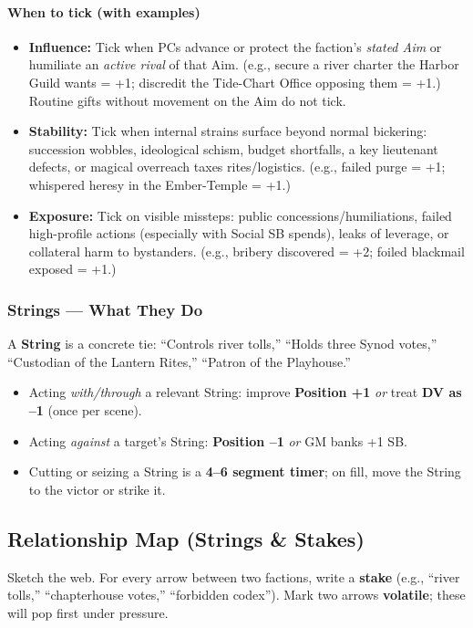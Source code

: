 \documentclass[11pt]{article}
\begin{document}
\paragraph{When to tick (with examples)}
\begin{itemize}
  \item \textbf{Influence:} Tick when PCs advance or protect the faction's \emph{stated Aim} or humiliate an \emph{active rival} of that Aim. (e.g., secure a river charter the Harbor Guild wants = +1; discredit the Tide-Chart Office opposing them = +1.) Routine gifts without movement on the Aim do not tick.
  \item \textbf{Stability:} Tick when internal strains surface beyond normal bickering: succession wobbles, ideological schism, budget shortfalls, a key lieutenant defects, or magical overreach taxes rites/logistics. (e.g., failed purge = +1; whispered heresy in the Ember-Temple = +1.)
  \item \textbf{Exposure:} Tick on visible missteps: public concessions/humiliations, failed high-profile actions (especially with Social SB spends), leaks of leverage, or collateral harm to bystanders. (e.g., bribery discovered = +2; foiled blackmail exposed = +1.)
\end{itemize}

\subsubsection*{Strings --- What They Do}
A \textbf{String} is a concrete tie: ``Controls river tolls,'' ``Holds three Synod votes,'' ``Custodian of the Lantern Rites,'' ``Patron of the Playhouse.''
\begin{itemize}
  \item Acting \emph{with/through} a relevant String: improve \textbf{Position +1} \emph{or} treat \textbf{DV as --1} (once per scene).
  \item Acting \emph{against} a target's String: \textbf{Position --1} \emph{or} GM banks +1 SB.
  \item Cutting or seizing a String is a \textbf{4--6 segment timer}; on fill, move the String to the victor or strike it.
\end{itemize}

\subsection{Relationship Map (Strings \& Stakes)}
Sketch the web. For every arrow between two factions, write a \textbf{stake} (e.g., ``river tolls,'' ``chapterhouse votes,'' ``forbidden codex''). Mark two arrows \textbf{volatile}; these will pop first under pressure.
\end{document}

